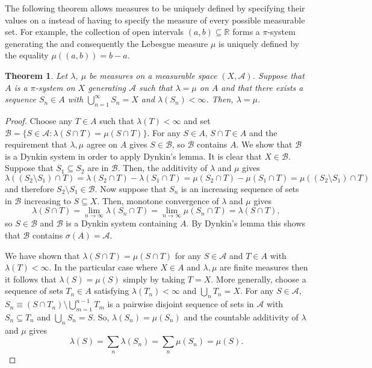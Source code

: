 \documentclass[12pt]{article}
\newtheorem*{theorem}{Theorem}
\begin{document}
The following theorem allows measures to be uniquely defined by specifying their values on a  instead of having to specify the measure of every possible measurable set. For example, the collection of open intervals $(a,b)\subseteq\mathbb{R}$ forms a $\pi$-system generating the  and consequently the Lebesgue measure $\mu$ is uniquely defined by the equality $\mu((a,b))=b-a$.

\begin{theorem}
Let $\lambda$, $\mu$ be measures on a measurable space $(X,\mathcal{A})$. Suppose that $A$ is a $\pi$-system on $X$ generating $\mathcal{A}$ such that $\lambda=\mu$ on $A$ and that there exists a sequence $S_n\in A$ with $\bigcup_{n=1}^\infty S_n=X$ and $\lambda(S_n)<\infty$. Then, $\lambda=\mu$.
\end{theorem}
\begin{proof}
Choose any $T\in A$ such that $\lambda(T)<\infty$ and set $\mathcal{B}=\{S\in\mathcal{A}:\lambda(S\cap T)=\mu(S\cap T)\}$. For any $S\in A$, $S\cap T\in A$ and the requirement that $\lambda,\mu$ agree on $A$ gives $S\in\mathcal{B}$, so $\mathcal{B}$ contains $A$. We show that $\mathcal{B}$ is a Dynkin system in order to apply Dynkin's lemma.
It is clear that $X\in\mathcal{B}$. Suppose that $S_1\subseteq S_2$ are in $\mathcal{B}$. Then, the additivity of $\lambda$ and $\mu$ gives
\begin{equation*}
\lambda\left((S_2\setminus S_1)\cap T\right) = \lambda(S_2\cap T)-\lambda(S_1\cap T)=\mu(S_2\cap T)-\mu(S_1\cap T) = \mu\left((S_2\setminus S_1)\cap T\right)
\end{equation*}
and therefore $S_2\setminus S_1\in\mathcal{B}$.
Now suppose that $S_n$ is an increasing sequence of sets in $\mathcal{B}$ increasing to $S\subseteq X$. Then, monotone convergence of $\lambda$ and $\mu$ gives
\begin{equation*}
\lambda(S\cap T)=\lim_{n\rightarrow\infty}\lambda(S_n\cap T)=\lim_{n\rightarrow\infty}\mu(S_n\cap T)=\lambda(S\cap T),
\end{equation*}
so $S\in\mathcal{B}$ and $\mathcal{B}$ is a Dynkin system containing $A$. By Dynkin's lemma this shows that $\mathcal{B}$ contains $\sigma(A)=\mathcal{A}$.

We have shown that $\lambda(S\cap T)=\mu(S\cap T)$ for any $S\in\mathcal{A}$ and $T\in A$ with $\lambda(T)<\infty$. In the particular case where $X\in A$ and $\lambda,\mu$ are finite measures then it follows that $\lambda(S)=\mu(S)$ simply by taking $T=X$.
More generally, choose a sequence of sets $T_n\in A$ satisfying $\lambda(T_n)<\infty$ and $\bigcup_nT_n=X$. For any $S\in\mathcal{A}$, $S_n\equiv (S\cap T_n)\setminus\bigcup_{m=1}^{n-1}T_m$ is a pairwise disjoint sequence of sets in $\mathcal{A}$ with $S_n\subseteq T_n$ and $\bigcup_nS_n=S$. So, $\lambda(S_n)=\mu(S_n)$ and the countable additivity of $\lambda$ and $\mu$ gives
\begin{equation*}
\lambda(S)=\sum_n\lambda(S_n)=\sum_n\mu(S_n)=\mu(S).
\end{equation*}
\end{proof}
\end{document}
